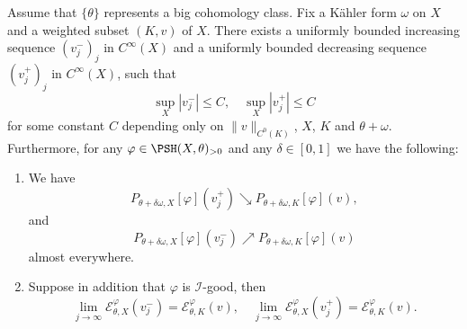 \begin{lemma}\label{lma:global_env_approx} 
    Assume that $\{\theta\}$ represents a big cohomology class.
    Fix a Kähler form $\omega$ on $X$ and a weighted subset $(K,v)$ of $X$. There exists a uniformly bounded increasing sequence $(v^-_j)_j$ in $C^\infty(X)$ and a uniformly bounded decreasing sequence $(v^+_j)_j$ in $C^\infty(X)$, such that
    \begin{equation}\label{eq:unf_bd_vj}
    \sup_X |v_j^-|\leq C,\quad \sup_X |v_j^+|\leq C
    \end{equation}
    for some constant $C$ depending only on $\|v\|_{C^0(K)}$, $X$, $K$ and $\theta+\omega$. Furthermore, for any $\varphi \in \PSH(X,\theta)_{>0}$ and any $\delta\in [0,1]$ we have the following:
\begin{enumerate}
    \item\label{itm:lma:global_env_approx:1} We have
    \[
    P_{\theta+\delta \omega,X}[\varphi](v_j^+) \searrow P_{\theta+\delta \omega,K}[\varphi](v),
    \]
    and
    \[
    P_{\theta+\delta \omega,X}[\varphi](v^-_j) \nearrow P_{\theta+\delta \omega,K}[\varphi](v)
    \]
    almost everywhere.
    \item\label{itm:lma:global_env_approx:2} Suppose in addition that $\varphi$ is $\mathcal{I}$-good, then
    \[
        \lim_{j\to\infty}\mathcal{E}_{\theta,X}^{\varphi}(v_j^-)=\mathcal{E}_{\theta,K}^{\varphi}(v),\quad \lim_{j\to\infty}\mathcal{E}_{\theta,X}^{\varphi}(v_j^+)=\mathcal{E}_{\theta,K}^{\varphi}(v).
    \]
\end{enumerate}
\end{lemma}
